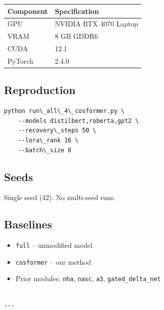 \begin{table}[H]
\centering
\small
\begin{tabular}{ll}
\toprule
\textbf{Component} & \textbf{Specification} \\
\midrule
GPU & NVIDIA RTX 4070 Laptop \\
VRAM & 8 GB GDDR6 \\
CUDA & 12.1 \\
PyTorch & 2.4.0 \\
\bottomrule
\end{tabular}
\end{table}

\subsection{Reproduction}

\begin{lstlisting}
python run\_all\_4\_cosformer.py \
    --models distilbert,roberta,gpt2 \
    --recovery\_steps 50 \
    --lora\_rank 16 \
    --batch\_size 8
\end{lstlisting}

\subsection{Seeds}

Single seed (42). No multi-seed runs.

\subsection{Baselines}

\begin{itemize}
\item \texttt{full} -- unmodified model
\item \texttt{cosformer} -- our method
\item Prior modules: \texttt{nha}, \texttt{nasc}, \texttt{a3}, \texttt{gated\_delta\_net}
\end{itemize}
\begin{lstlisting}

---
\end{lstlisting}